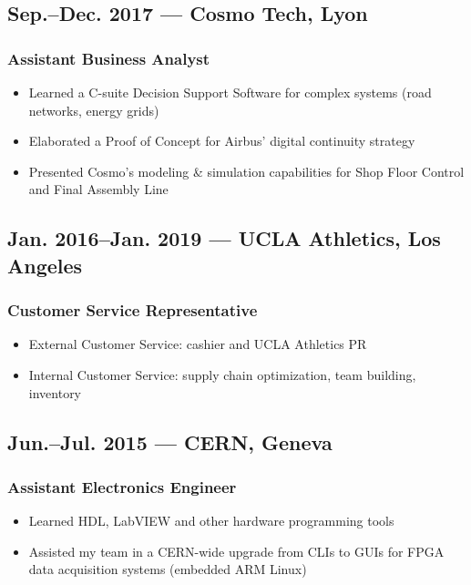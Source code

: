 \documentclass[10pt]{article}
\begin{document}
\subsection*{Sep.--Dec. 2017 --- Cosmo Tech, Lyon}
\subsubsection*{Assistant Business Analyst}
\begin{itemize}
    \item Learned a C-suite Decision Support Software for complex systems (road networks, energy grids)
    \item Elaborated a Proof of Concept for Airbus’ digital continuity strategy
    \item Presented Cosmo’s modeling \& simulation capabilities for Shop Floor Control and Final Assembly Line
\end{itemize}
\subsection*{Jan. 2016--Jan. 2019 --- UCLA Athletics, Los Angeles}
\subsubsection*{Customer Service Representative}
\begin{itemize}
    \item  External Customer Service: cashier and UCLA Athletics PR
    \item Internal Customer Service: supply chain optimization, team building, inventory
\end{itemize}
\subsection*{Jun.--Jul. 2015 --- CERN, Geneva}
\subsubsection*{Assistant Electronics Engineer}
\begin{itemize}
    \item Learned HDL, LabVIEW and other hardware programming tools
    \item Assisted my team in a CERN-wide upgrade from CLIs to GUIs for FPGA data acquisition systems (embedded ARM Linux)
\end{itemize}
\end{document}
